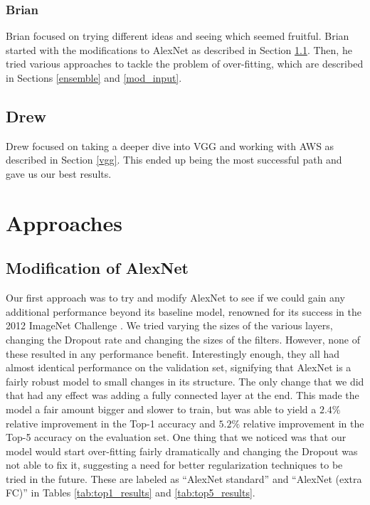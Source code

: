 \documentclass[10pt,twocolumn,letterpaper]{article}
\begin{document}
\subsubsection{Brian}
Brian focused on trying different ideas and seeing which seemed fruitful.  Brian started with the modifications to AlexNet as described in Section \ref{mod_alex}.  Then, he tried various approaches to tackle the problem of over-fitting, which are described in Sections \ref{ensemble} and \ref{mod_input}.

\subsection{Drew}
Drew focused on taking a deeper dive into VGG and working with AWS as described in Section \ref{vgg}.  This ended up being the most successful path and gave us our best results.

\section{Approaches}
\subsection{Modification of AlexNet}
\label{mod_alex}
Our first approach was to try and modify AlexNet to see if we could gain any additional performance beyond its baseline model, renowned for its success in the 2012 ImageNet Challenge \cite{AlexNet}. We tried varying the sizes of the various layers, changing the Dropout rate and changing the sizes of the filters.  However, none of these resulted in any performance benefit.  Interestingly enough, they all had almost identical performance on the validation set, signifying that AlexNet is a fairly robust model to small changes in its structure.  The only change that we did that had any effect was adding a fully connected layer at the end.  This made the model a fair amount bigger and slower to train, but was able to yield a $2.4\%$ relative improvement in the Top-1 accuracy and $5.2\%$ relative improvement in the Top-5 accuracy on the evaluation set.  One thing that we noticed was that our model would start over-fitting fairly dramatically and changing the Dropout was not able to fix it, suggesting a need for better regularization techniques to be tried in the future.  These are labeled as ``AlexNet standard'' and ``AlexNet (extra FC)'' in Tables \ref{tab:top1_results} and \ref{tab:top5_results}.
\end{document}

